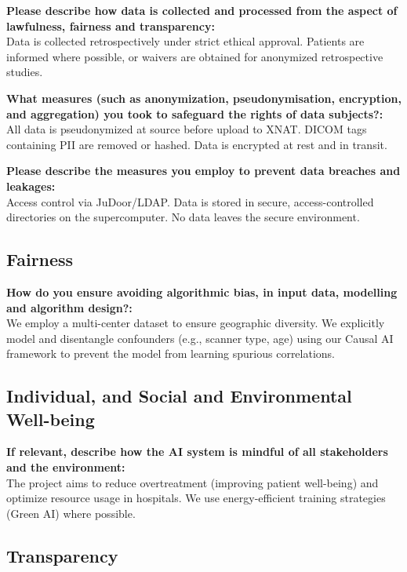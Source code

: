 \documentclass[11pt, a4paper]{article}
\begin{document}
\noindent\textbf{Please describe how data is collected and processed from the aspect of lawfulness, fairness and transparency:} \\
Data is collected retrospectively under strict ethical approval. Patients are informed where possible, or waivers are obtained for anonymized retrospective studies.

\vspace{0.5em}
\noindent\textbf{What measures (such as anonymization, pseudonymisation, encryption, and aggregation) you took to safeguard the rights of data subjects?:} \\
All data is pseudonymized at source before upload to XNAT. DICOM tags containing PII are removed or hashed. Data is encrypted at rest and in transit.

\vspace{0.5em}
\noindent\textbf{Please describe the measures you employ to prevent data breaches and leakages:} \\
Access control via JuDoor/LDAP. Data is stored in secure, access-controlled directories on the supercomputer. No data leaves the secure environment.

\subsection*{Fairness}

\noindent\textbf{How do you ensure avoiding algorithmic bias, in input data, modelling and algorithm design?:} \\
We employ a multi-center dataset to ensure geographic diversity. We explicitly model and disentangle confounders (e.g., scanner type, age) using our Causal AI framework to prevent the model from learning spurious correlations.

\subsection*{Individual, and Social and Environmental Well-being}

\noindent\textbf{If relevant, describe how the AI system is mindful of all stakeholders and the environment:} \\
The project aims to reduce overtreatment (improving patient well-being) and optimize resource usage in hospitals. We use energy-efficient training strategies (Green AI) where possible.

\subsection*{Transparency}
\end{document}
